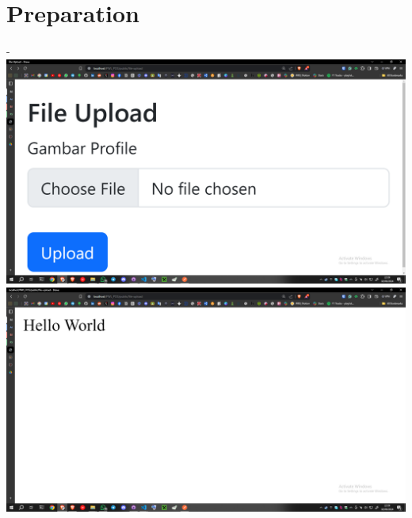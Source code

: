 \documentclass[12pt,titlepage]{article}
\begin{document}
\section{Preparation}
- 
\\ \includegraphics[width=.9\textwidth]{images/figures/Screenshot (489).png}
\\ \includegraphics[width=.9\textwidth]{images/figures/Screenshot (490).png}
\end{document}
